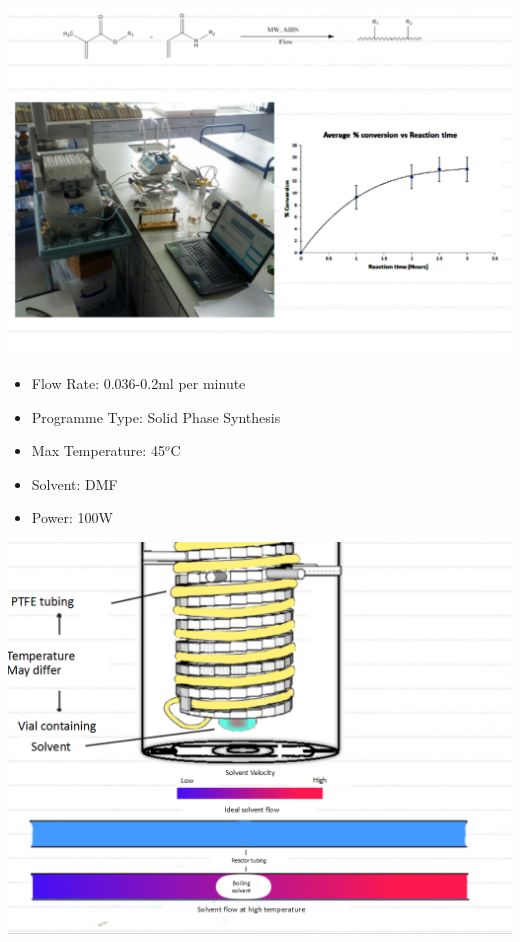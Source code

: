 \documentclass[10pt, compress]{beamer}
\begin{document}
\begin{frame}
\includegraphics[width=\textwidth]{simpleuse.PNG}
\begin{itemize}
    \item {Flow Rate: 0.036-0.2ml per minute}
    \item {Programme Type: Solid Phase Synthesis}
    \item {Max Temperature: 45$^o$C}
    \item {Solvent: DMF}
    \item {Power: 100W}
\end{itemize}
\end{frame}

\begin{frame}
\begin{center}
\includegraphics[width=\textwidth]{problems.png}\end{center}
\end{frame}
\end{document}
